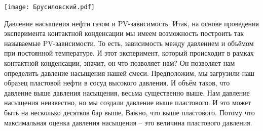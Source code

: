\documentclass[main.tex]{subfiles}
\begin{document}
\begin{center}
\texttt{[image: Брусиловский.pdf]}
\end{center}

Давление насыщения нефти газом и PV-зависимость.
Итак, на основе проведения эксперимента контактной конденсации мы имеем возможность построить так называемые PV-зависимости.
То есть, зависимость между давлением и объёмом при постоянной температуре.
И этот эксперимент, который происходит в рамках контактной конденсации, значит, он что позволяет нам?
Он позволяет нам определить давление насыщения нашей смеси.
Предположим, мы загрузили наш образец пластовой нефти в сосуд высокого давления.
И объём таков, что давление выше давления насыщения, весьма существенно выше.
Нам давление насыщения неизвестно, но мы создали давление выше пластового.
И это может быть на несколько десятков бар выше.
Важно, что выше пластового.
Потому что максимальная оценка давления насыщения -- это величина пластового давления.
\end{document}
